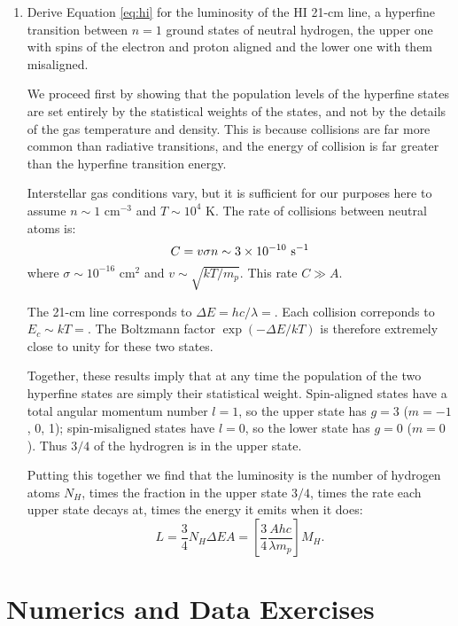\begin{enumerate}
\item Derive Equation \ref{eq:hi} for the luminosity of the HI 21-cm
line, a hyperfine transition between $n=1$ ground states of neutral
hydrogen, the upper one with spins of the electron and proton aligned
and the lower one with them misaligned.

\begin{answer}
We proceed first by showing that the population levels of the
hyperfine states are set entirely by the statistical weights of the
states, and not by the details of the gas temperature and
density. This is because collisions are far more common than radiative
transitions, and the energy of collision is far greater than the
hyperfine transition energy.

Interstellar gas conditions vary, but it is sufficient for our
purposes here to assume $n\sim 1$ cm$^{-3}$ and $T\sim 10^4$ K.  The
rate of collisions between neutral atoms is:
\begin{equation}
C = v \sigma n \sim 3\times 10^{-10} {\rm ~s}^{-1}
\end{equation}
where $\sigma \sim 10^{-16}$ cm$^{2}$ and $v\sim \sqrt{kT/m_p}$. This
rate $C\gg A$.

The 21-cm line corresponds to $\Delta E = hc / \lambda = $. Each
collision correponds to $E_c \sim kT =$. The Boltzmann factor
$\exp(-\Delta E/kT)$ is therefore extremely close to unity for these
two states.

Together, these results imply that at any time the population of the
two hyperfine states are simply their statistical weight. Spin-aligned
states have a total angular momentum number $l=1$, so the upper state
has $g=3$ ($m=-1$, 0, 1); spin-misaligned states have $l=0$, so the
lower state has $g=0$ ($m=0$). Thus $3/4$ of the hydrogren is in the
upper state. 

Putting this together we find that the luminosity is the number of
hydrogen atoms $N_H$, times the fraction in the upper state $3/4$,
times the rate each upper state decays at, times the energy it emits
when it does:
\begin{equation}
\label{eq:hi}
L = \frac{3}{4} N_H \Delta E A =  \left[ \frac{3}{4} \frac{A hc}
{\lambda m_p} \right] M_H. 
\end{equation}
\end{answer}
\end{enumerate}

\section{Numerics and Data Exercises}

